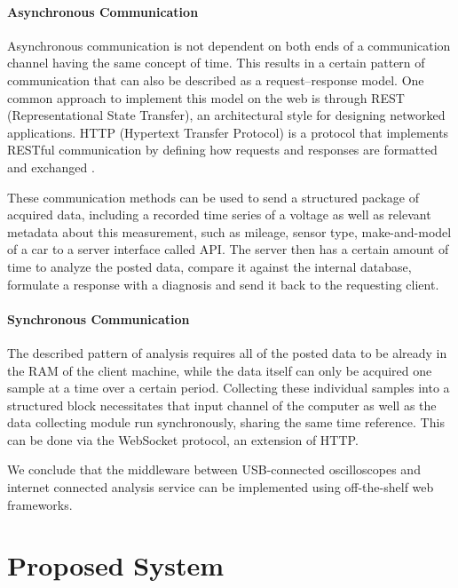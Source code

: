 \paragraph{Asynchronous Communication}
Asynchronous communication is not dependent on both ends of a communication channel having the same concept of time. 
This results in a certain pattern of communication that can also be described as a request–response model. 
One common approach to implement this model on the web is through REST (Representational State Transfer), an architectural style for designing networked applications. 
HTTP (Hypertext Transfer Protocol) is a protocol that implements RESTful communication by defining how requests and responses are formatted and exchanged \cite{Fielding2000}.

These communication methods can be used to send a structured package of acquired data, including a recorded time series of a voltage as well as relevant metadata about this measurement, 
such as mileage, sensor type, make-and-model of a car to a server interface called API. 
The server then has a certain amount of time to analyze the posted data, compare it against the internal database, formulate a response with a diagnosis and send it back to the requesting client.

\paragraph{Synchronous Communication}
The described pattern of analysis requires all of the posted data to be already in the RAM of the client machine, while the data itself can only be acquired one sample at a time over a certain period. 
Collecting these individual samples into a structured block necessitates that input channel of the computer as well as the data collecting module run synchronously, sharing the same time reference. 
This can be done via the WebSocket protocol, an extension of HTTP.

We conclude that the middleware between USB-connected oscilloscopes and internet connected analysis service can be implemented using off-the-shelf web frameworks.

\section{Proposed System}
